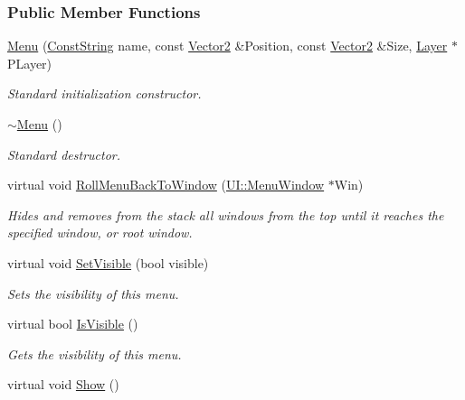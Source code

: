 \subsubsection*{Public Member Functions}
\begin{DoxyCompactItemize}
\item 
\hyperlink{classphys_1_1UI_1_1Menu_a1e72810ec8bd64775619fa949f63797e}{Menu} (\hyperlink{namespacephys_a5ce5049f8b4bf88d6413c47b504ebb31}{ConstString} name, const \hyperlink{classphys_1_1Vector2}{Vector2} \&Position, const \hyperlink{classphys_1_1Vector2}{Vector2} \&Size, \hyperlink{classphys_1_1UI_1_1Layer}{Layer} $\ast$PLayer)
\begin{DoxyCompactList}\small\item\em Standard initialization constructor. \item\end{DoxyCompactList}\item 
\hypertarget{classphys_1_1UI_1_1Menu_a54b60c45238a3655da9dfa83104adb18}{
\hyperlink{classphys_1_1UI_1_1Menu_a54b60c45238a3655da9dfa83104adb18}{$\sim$Menu} ()}
\label{classphys_1_1UI_1_1Menu_a54b60c45238a3655da9dfa83104adb18}

\begin{DoxyCompactList}\small\item\em Standard destructor. \item\end{DoxyCompactList}\item 
virtual void \hyperlink{classphys_1_1UI_1_1Menu_a7eb3efc2675bf281a829f69416b46327}{RollMenuBackToWindow} (\hyperlink{classphys_1_1UI_1_1MenuWindow}{UI::MenuWindow} $\ast$Win)
\begin{DoxyCompactList}\small\item\em Hides and removes from the stack all windows from the top until it reaches the specified window, or root window. \item\end{DoxyCompactList}\item 
virtual void \hyperlink{classphys_1_1UI_1_1Menu_a4847e0de055a9c2f708f98742fa59a87}{SetVisible} (bool visible)
\begin{DoxyCompactList}\small\item\em Sets the visibility of this menu. \item\end{DoxyCompactList}\item 
virtual bool \hyperlink{classphys_1_1UI_1_1Menu_ae23321617d7e14448e2fab3b455c3dc7}{IsVisible} ()
\begin{DoxyCompactList}\small\item\em Gets the visibility of this menu. \item\end{DoxyCompactList}\item 
\hypertarget{classphys_1_1UI_1_1Menu_aeb6373cc1be7da0bf5966129f271c861}{
virtual void \hyperlink{classphys_1_1UI_1_1Menu_aeb6373cc1be7da0bf5966129f271c861}{Show} ()}
\label{classphys_1_1UI_1_1Menu_aeb6373cc1be7da0bf5966129f271c861}


\end{DoxyCompactItemize}
